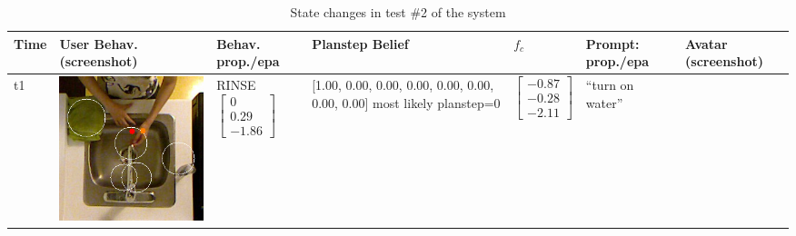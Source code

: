 %

\begin{longtable}{| V{0.8cm} | V{2.6cm} | V{1.6cm} | V{2.1cm} | V{1.55cm} | V{1.6cm} | V{3.2cm} |}
\caption{State changes in test \#2 of the system}
\label{table:result-2}
\\ \hline


Time &
User Behav. (screenshot) &
Behav. prop./epa &
Planstep Belief &
$f_c$ &
Prompt: prop./epa &
Avatar (screenshot) \\ \hline
\endfirsthead

t1 &
\includegraphics[width=\linewidth]{fig/system/_slow2-rinse1_.jpg} &
RINSE
\linebreak\linebreak
$\begin{bmatrix}
0 \\
0.29 \\
-1.86
\end{bmatrix}$ &
[1.00, 0.00, 0.00, 0.00, 0.00, 0.00, 0.00, 0.00] most likely planstep=0 &
$\begin{bmatrix}
-0.87 \\
-0.28 \\
-2.11
\end{bmatrix}$ &
``turn on water''
\linebreak\linebreak

\end{longtable}
